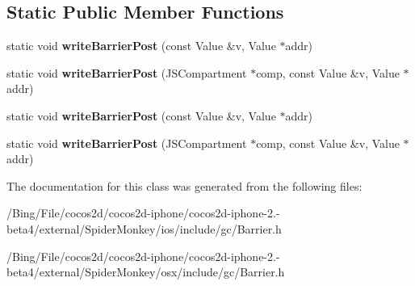 \subsection*{Static Public Member Functions}
\begin{DoxyCompactItemize}
\item 
\hypertarget{classjs_1_1_heap_value_a93e35db7cbdf753056917d9f0ecf0917}{static void {\bfseries write\-Barrier\-Post} (const Value \&v, Value $\ast$addr)}\label{classjs_1_1_heap_value_a93e35db7cbdf753056917d9f0ecf0917}

\item 
\hypertarget{classjs_1_1_heap_value_a0d85ba3c97adfdd4b4ac628e3a7a35e9}{static void {\bfseries write\-Barrier\-Post} (J\-S\-Compartment $\ast$comp, const Value \&v, Value $\ast$addr)}\label{classjs_1_1_heap_value_a0d85ba3c97adfdd4b4ac628e3a7a35e9}

\item 
\hypertarget{classjs_1_1_heap_value_a93e35db7cbdf753056917d9f0ecf0917}{static void {\bfseries write\-Barrier\-Post} (const Value \&v, Value $\ast$addr)}\label{classjs_1_1_heap_value_a93e35db7cbdf753056917d9f0ecf0917}

\item 
\hypertarget{classjs_1_1_heap_value_a0d85ba3c97adfdd4b4ac628e3a7a35e9}{static void {\bfseries write\-Barrier\-Post} (J\-S\-Compartment $\ast$comp, const Value \&v, Value $\ast$addr)}\label{classjs_1_1_heap_value_a0d85ba3c97adfdd4b4ac628e3a7a35e9}

\end{DoxyCompactItemize}


The documentation for this class was generated from the following files\-:\begin{DoxyCompactItemize}
\item 
/\-Bing/\-File/cocos2d/cocos2d-\/iphone/cocos2d-\/iphone-\/2.-\/beta4/external/\-Spider\-Monkey/ios/include/gc/Barrier.\-h\item 
/\-Bing/\-File/cocos2d/cocos2d-\/iphone/cocos2d-\/iphone-\/2.-\/beta4/external/\-Spider\-Monkey/osx/include/gc/Barrier.\-h\end{DoxyCompactItemize}
